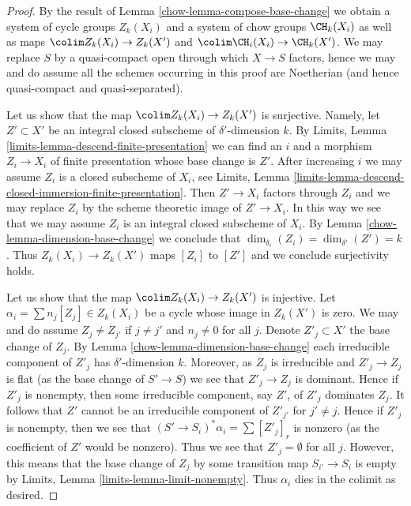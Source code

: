 \begin{proof}

By the result of Lemma \ref{chow-lemma-compose-base-change} we obtain
a system of cycle groups $Z_k(X_i)$ and a system of
chow groups $\CH_k(X_i)$ as well as maps
$\colim Z_k(X_i) \to Z_k(X')$ and $\colim \CH_i(X_i) \to \CH_k(X')$.
We may replace $S$ by a quasi-compact open through which $X \to S$
factors, hence we may and do assume all the schemes occurring in
this proof are Noetherian (and hence quasi-compact and quasi-separated).

\medskip\noindent
Let us show that the map $\colim Z_k(X_i) \to Z_k(X')$ is surjective.
Namely, let $Z' \subset X'$
be an integral closed subscheme of $\delta'$-dimension $k$. By
Limits, Lemma \ref{limits-lemma-descend-finite-presentation}
we can find an $i$ and a morphism $Z_i \to X_i$ of finite presentation
whose base change is $Z'$. After increasing $i$ we may assume $Z_i$
is a closed subscheme of $X_i$, see
Limits, Lemma \ref{limits-lemma-descend-closed-immersion-finite-presentation}.
Then $Z' \to X_i$ factors through $Z_i$ and we may replace $Z_i$
by the scheme theoretic image of $Z' \to X_i$. In this way we see
that we may assume $Z_i$ is an integral closed subscheme of $X_i$.
By Lemma \ref{chow-lemma-dimension-base-change} we conclude that
$\dim_{\delta_i}(Z_i) = \dim_{\delta'}(Z') = k$.
Thus $Z_k(X_i) \to Z_k(X')$ maps $[Z_i]$ to $[Z']$ and
we conclude surjectivity holds.

\medskip\noindent
Let us show that the map $\colim Z_k(X_i) \to Z_k(X')$ is injective.
Let $\alpha_i = \sum n_j[Z_j] \in Z_k(X_i)$ be a cycle whose image
in $Z_k(X')$ is zero. We may and do assume $Z_j \not = Z_{j'}$ if
$j \not = j'$ and $n_j \not = 0$ for all $j$.
Denote $Z'_j \subset X'$ the base change of $Z_j$.
By Lemma \ref{chow-lemma-dimension-base-change} each irreducible component
of $Z'_j$ has $\delta'$-dimension $k$. Moreover, as $Z_j$ is irreducible
and $Z'_j \to Z_j$ is flat (as the base change of $S' \to S$)
we see that $Z'_j \to Z_j$ is dominant.
Hence if $Z'_j$ is nonempty, then some irreducible component, say
$Z'$, of $Z'_j$ dominates $Z_j$. It follows that $Z'$
cannot be an irreducible component of $Z'_{j'}$ for $j' \not = j$.
Hence if $Z'_j$ is nonempty, then we see that $(S' \to S_i)^*\alpha_i
= \sum [Z'_j]_r$ is nonzero (as the coefficient of $Z'$ would be nonzero).
Thus we see that $Z'_j = \emptyset$ for all $j$. However, this means
that the base change of $Z_j$ by some transition map $S_{i'} \to S_i$
is empty by Limits, Lemma \ref{limits-lemma-limit-nonempty}.
Thus $\alpha_i$ dies in the colimit as desired.


\end{proof}
